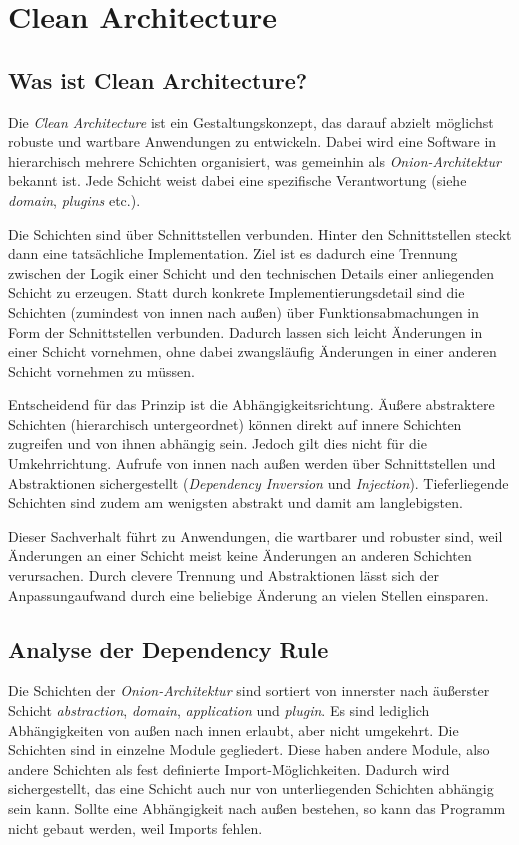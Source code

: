 \chapter{Clean Architecture}

\section{Was ist Clean Architecture?}
Die \textit{Clean Architecture} ist ein Gestaltungskonzept, das darauf
abzielt möglichst robuste und wartbare Anwendungen zu entwickeln. Dabei
wird eine Software in hierarchisch mehrere Schichten organisiert, was
gemeinhin als \textit{Onion-Architektur} bekannt ist. Jede Schicht
weist dabei eine spezifische Verantwortung (siehe \textit{domain}, 
\textit{plugins} etc.). 

Die Schichten sind über Schnittstellen verbunden. Hinter den
Schnittstellen steckt dann eine tatsächliche Implementation. Ziel ist
es dadurch eine Trennung zwischen der Logik einer Schicht und den
technischen Details einer anliegenden Schicht zu erzeugen. Statt durch
konkrete Implementierungsdetail sind die Schichten (zumindest von innen
nach außen) über
Funktionsabmachungen in Form der Schnittstellen verbunden. Dadurch
lassen sich leicht Änderungen in einer Schicht vornehmen, ohne dabei
zwangsläufig Änderungen in einer anderen Schicht vornehmen zu müssen.

Entscheidend für das Prinzip ist die Abhängigkeitsrichtung. Äußere
abstraktere Schichten (hierarchisch untergeordnet) können direkt auf
innere Schichten zugreifen und von ihnen abhängig sein. Jedoch gilt
dies nicht für die Umkehrrichtung. Aufrufe von innen nach außen werden
über Schnittstellen und Abstraktionen sichergestellt 
(\textit{Dependency Inversion} und \textit{Injection}).
Tieferliegende Schichten sind zudem am wenigsten abstrakt und damit
am langlebigsten.

Dieser Sachverhalt führt zu Anwendungen, die wartbarer und robuster sind,
weil Änderungen an einer Schicht meist keine Änderungen an anderen
Schichten verursachen. Durch clevere Trennung und Abstraktionen lässt
sich der Anpassungaufwand durch eine beliebige Änderung an vielen Stellen
einsparen.

\section{Analyse der Dependency Rule}
Die Schichten der \textit{Onion-Architektur} sind sortiert von innerster
nach äußerster Schicht \textit{abstraction}, \textit{domain},
\textit{application} und \textit{plugin}. Es sind lediglich Abhängigkeiten
von außen nach innen erlaubt, aber nicht umgekehrt. Die Schichten sind
in einzelne Module gegliedert. Diese haben andere Module, also andere
Schichten als fest definierte Import-Möglichkeiten. Dadurch wird
sichergestellt, das eine Schicht auch nur von unterliegenden Schichten
abhängig sein kann. Sollte eine Abhängigkeit nach außen bestehen, so
kann das Programm nicht gebaut werden, weil Imports fehlen.

